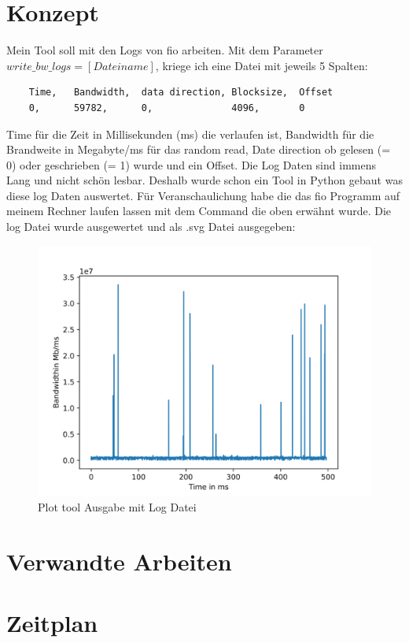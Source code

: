 \documentclass{article}
\begin{document}
\section{Konzept}
Mein Tool soll mit den Logs von fio arbeiten. \newline
Mit dem Parameter $write\_bw\_logs=[Dateiname]$, kriege ich eine Datei mit jeweils 5 Spalten:
\begin{lstlisting}
    Time,	Bandwidth,	data direction, Blocksize,	Offset
    0, 	    59782, 		0,		        4096,		0
\end{lstlisting}
Time für die Zeit in Millisekunden (ms) die verlaufen ist, Bandwidth für die Brandweite in Megabyte/ms
für das random read, Date direction ob gelesen (= 0) oder geschrieben (= 1) wurde
und ein Offset. Die Log Daten sind immens Lang und nicht schön lesbar. Deshalb wurde schon ein Tool in Python gebaut 
was diese log Daten auswertet. Für Veranschaulichung habe die das fio Programm auf meinem Rechner laufen lassen mit dem
Command die oben erwähnt wurde. Die log Datei wurde ausgewertet und als .svg Datei ausgegeben:
\begin{figure}[ht!]
    \centering
    \includegraphics[width=120mm]{./Code/nm_mytest_bw.jpg}
    \caption{Plot tool Ausgabe mit Log Datei  \label{overflow}}
    \end{figure}

\section{Verwandte Arbeiten}
\section{Zeitplan}
\end{document}
